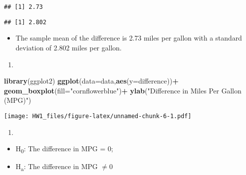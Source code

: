 \documentclass[]{article}
\newenvironment{Shaded}{\begin{snugshade}}{\end{snugshade}}
\newcommand{\KeywordTok}[1]{\textcolor[rgb]{0.13,0.29,0.53}{\textbf{#1}}}
\newcommand{\DataTypeTok}[1]{\textcolor[rgb]{0.13,0.29,0.53}{#1}}
\newcommand{\DecValTok}[1]{\textcolor[rgb]{0.00,0.00,0.81}{#1}}
\newcommand{\StringTok}[1]{\textcolor[rgb]{0.31,0.60,0.02}{#1}}
\newcommand{\OperatorTok}[1]{\textcolor[rgb]{0.81,0.36,0.00}{\textbf{#1}}}
\newcommand{\NormalTok}[1]{#1}
\providecommand{\tightlist}{%
  \setlength{\itemsep}{0pt}\setlength{\parskip}{0pt}}
\begin{document}
\begin{verbatim}
## [1] 2.73
\end{verbatim}

\begin{Shaded}
\end{Shaded}

\begin{verbatim}
## [1] 2.802
\end{verbatim}

\begin{itemize}
\tightlist
\item
  The sample mean of the difference is 2.73 miles per gallon with a
  standard deviation of 2.802 miles per gallon.
\end{itemize}

\begin{enumerate}
\def\labelenumi{(\alph{enumi})}
\setcounter{enumi}{1}
\item
\end{enumerate}

\begin{Shaded}
\begin{Highlighting}[]
\KeywordTok{library}\NormalTok{(ggplot2)}
\KeywordTok{ggplot}\NormalTok{(}\DataTypeTok{data=}\NormalTok{data,}\KeywordTok{aes}\NormalTok{(}\DataTypeTok{y=}\NormalTok{difference))}\OperatorTok{+}
\StringTok{       }\KeywordTok{geom_boxplot}\NormalTok{(}\DataTypeTok{fill=}\StringTok{"cornflowerblue"}\NormalTok{)}\OperatorTok{+}
\StringTok{       }\KeywordTok{ylab}\NormalTok{(}\StringTok{"Difference in Miles Per Gallon (MPG)"}\NormalTok{)}
\end{Highlighting}
\end{Shaded}

\texttt{[image: HW1\_files/figure-latex/unnamed-chunk-6-1.pdf]}

\begin{enumerate}
\def\labelenumi{(\alph{enumi})}
\setcounter{enumi}{2}
\item
\end{enumerate}

\begin{itemize}
\tightlist
\item
  H\textsubscript{0}: The difference in MPG = 0;
\item
  H\textsubscript{a}: The difference in MPG \(\ne0\)
\end{itemize}
\end{document}
